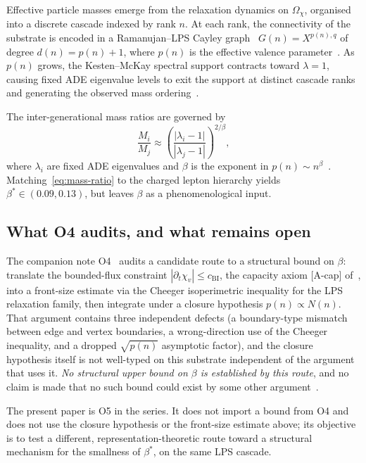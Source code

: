 \documentclass[11pt,a4paper]{article}
\theoremstyle{plain}
\theoremstyle{definition}
\theoremstyle{remark}
\newcommand{\betastar}{\beta^*}
\begin{document}
      Effective particle masses emerge from the relaxation dynamics on $\Omega_\chi$, organised into
      a discrete cascade indexed by rank $n$.
      At each rank, the connectivity of the substrate is encoded in a Ramanujan--LPS Cayley
      graph~\cite{LPS} $G(n) = X^{p(n),q}$ of degree $d(n) = p(n)+1$, where $p(n)$ is the effective
      valence parameter~\cite{Beau2026a6}.
      As $p(n)$ grows, the Kesten--McKay spectral support contracts toward $\lambda = 1$, causing
      fixed ADE eigenvalue levels to exit the support at distinct cascade ranks and generating the
      observed mass ordering~\cite{Beau2026a7}.

      The inter-generational mass ratios are governed by
      \begin{equation}
        \label{eq:mass-ratio}
        \frac{M_i}{M_j} \approx
        \left(\frac{|\lambda_i - 1|}{|\lambda_j - 1|}\right)^{2/\beta},
      \end{equation}
      where $\lambda_i$ are fixed ADE eigenvalues and $\beta$ is the exponent in $p(n) \sim n^\beta$~\cite{Beau2026a7}.
      Matching~\eqref{eq:mass-ratio} to the charged lepton hierarchy yields
      $\betastar \in (0.09, 0.13)$, but leaves $\beta$ as a phenomenological input.

    \subsection{What O4 audits, and what remains open}

      The companion note O4~\cite{Beau2026a8} audits a candidate route to a structural bound on
      $\beta$: translate the bounded-flux constraint $|\partial_t \chi_v| \le c_{\mathrm{BI}}$, the
      capacity axiom [A-cap] of~\cite{Beau2026c}, into a front-size estimate via the Cheeger
      isoperimetric inequality for the LPS relaxation family, then integrate under a closure
      hypothesis $p(n) \propto N(n)$.
      That argument contains three independent defects (a boundary-type mismatch between edge and
      vertex boundaries, a wrong-direction use of the Cheeger inequality, and a dropped
      $\sqrt{p(n)}$ asymptotic factor), and the closure hypothesis itself is not well-typed on this
      substrate independent of the argument that uses it.
      \emph{No structural upper bound on $\beta$ is established by this route}, and no claim is made
      that no such bound could exist by some other argument~\cite{Beau2026a8}.

      The present paper is O5 in the series.
      It does not import a bound from O4 and does not use the closure hypothesis or the front-size
      estimate above; its objective is to test a different, representation-theoretic route toward a
      structural mechanism for the smallness of $\betastar$, on the same LPS cascade.
\end{document}
